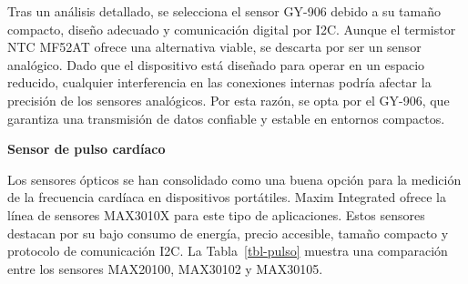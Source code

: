 \documentclass[
  letterpaper,
  DIV=11,
  numbers=noendperiod]{scrreport}
\begin{document}
Tras un análisis detallado, se selecciona el sensor GY-906 debido a su
tamaño compacto, diseño adecuado y comunicación digital por I2C. Aunque
el termistor NTC MF52AT ofrece una alternativa viable, se descarta por
ser un sensor analógico. Dado que el dispositivo está diseñado para
operar en un espacio reducido, cualquier interferencia en las conexiones
internas podría afectar la precisión de los sensores analógicos. Por
esta razón, se opta por el GY-906, que garantiza una transmisión de
datos confiable y estable en entornos compactos.

\textbf{Sensor de pulso cardíaco}

Los sensores ópticos se han consolidado como una buena opción para la
medición de la frecuencia cardíaca en dispositivos portátiles. Maxim
Integrated ofrece la línea de sensores MAX3010X para este tipo de
aplicaciones. Estos sensores destacan por su bajo consumo de energía,
precio accesible, tamaño compacto y protocolo de comunicación I2C. La
Tabla~\ref{tbl-pulso} muestra una comparación entre los sensores
MAX20100, MAX30102 y MAX30105.
\end{document}

